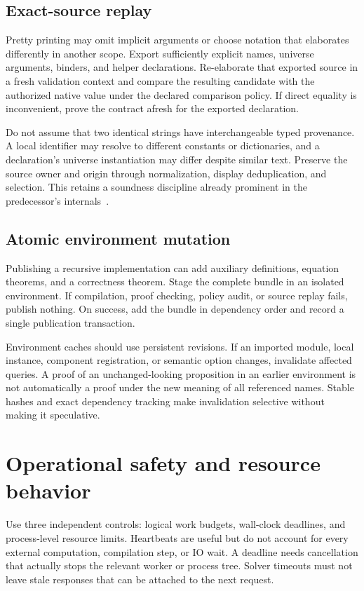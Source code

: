 \subsection{Exact-source replay}

Pretty printing may omit implicit arguments or choose notation that elaborates differently in another scope. Export sufficiently explicit names, universe arguments, binders, and helper declarations. Re-elaborate that exported source in a fresh validation context and compare the resulting candidate with the authorized native value under the declared comparison policy. If direct equality is inconvenient, prove the contract afresh for the exported declaration.

Do not assume that two identical strings have interchangeable typed provenance. A local identifier may resolve to different constants or dictionaries, and a declaration's universe instantiation may differ despite similar text. Preserve the source owner and origin through normalization, display deduplication, and selection. This retains a soundness discipline already prominent in the predecessor's internals~\cite{internals}.

\subsection{Atomic environment mutation}

Publishing a recursive implementation can add auxiliary definitions, equation theorems, and a correctness theorem. Stage the complete bundle in an isolated environment. If compilation, proof checking, policy audit, or source replay fails, publish nothing. On success, add the bundle in dependency order and record a single publication transaction.

Environment caches should use persistent revisions. If an imported module, local instance, component registration, or semantic option changes, invalidate affected queries. A proof of an unchanged-looking proposition in an earlier environment is not automatically a proof under the new meaning of all referenced names. Stable hashes and exact dependency tracking make invalidation selective without making it speculative.

\section{Operational safety and resource behavior}
\label{sec:operations}

Use three independent controls: logical work budgets, wall-clock deadlines, and process-level resource limits. Heartbeats are useful but do not account for every external computation, compilation step, or IO wait. A deadline needs cancellation that actually stops the relevant worker or process tree. Solver timeouts must not leave stale responses that can be attached to the next request.

